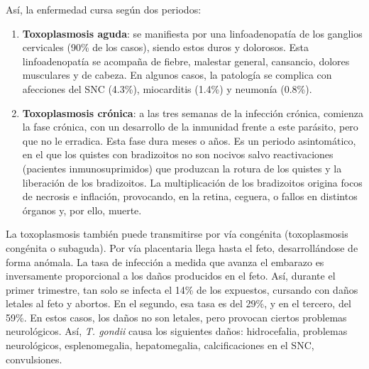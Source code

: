 Así, la enfermedad cursa según dos periodos:
\begin{enumerate}[itemsep=0pt,parsep=0pt,topsep=0pt,partopsep=0pt]
	\item \textbf{Toxoplasmosis aguda}: se manifiesta por una linfoadenopatía de los ganglios cervicales (90\% de los casos), siendo estos duros y dolorosos. Esta linfoadenopatía se acompaña de fiebre, malestar general, cansancio, dolores musculares y de cabeza. En algunos casos, la patología se complica con afecciones del SNC (4.3\%), miocarditis (1.4\%) y neumonía (0.8\%).
	\item \textbf{Toxoplasmosis crónica}: a las tres semanas de la infección crónica, comienza la fase crónica, con un desarrollo de la inmunidad frente a este parásito, pero que no le erradica. Esta fase dura meses o años. Es un periodo asintomático, en el que los quistes con bradizoitos no son nocivos salvo reactivaciones (pacientes inmunosuprimidos) que produzcan la rotura de los quistes y la liberación de los bradizoitos. La multiplicación de los bradizoitos origina focos de necrosis e inflación, provocando, en la retina, ceguera, o fallos en distintos órganos y, por ello, muerte.
\end{enumerate}

La toxoplasmosis también puede transmitirse por vía congénita (toxoplasmosis congénita o  subaguda). Por vía placentaria llega hasta el feto, desarrollándose de forma anómala. La tasa de infección a medida que avanza el embarazo es inversamente proporcional a los daños producidos en el feto. Así, durante el primer trimestre, tan solo se infecta el 14\% de los expuestos, cursando con daños letales al feto y abortos. En el segundo, esa tasa es del 29\%, y en el tercero, del 59\%. En estos casos, los daños no son letales, pero provocan ciertos problemas neurológicos. Así, \textit{T. gondii} causa los siguientes daños: hidrocefalia, problemas neurológicos, esplenomegalia, hepatomegalia, calcificaciones en el SNC, convulsiones.
